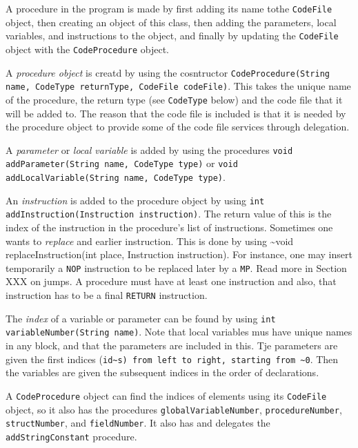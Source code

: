 \documentclass[11pt]{article}
\begin{document}
A procedure in the program is made by first adding its name tothe
\texttt{CodeFile} object, then creating an object of this class, then adding the
parameters, local variables, and instructions to the object, and finally by
updating the \texttt{CodeFile} object with the \texttt{CodeProcedure} object.

A \emph{procedure object} is creatd by using the cosntructor
\texttt{CodeProcedure(String name, CodeType returnType, CodeFile codeFile)}. This
takes the unique name of the procedure, the return type (see \texttt{CodeType}
below) and the code file that it will be added to. The reason that the code
file is included is that it is needed by the procedure object to provide
some of the code file services through delegation.


A \emph{parameter} or \emph{local variable} is added by using the procedures \texttt{void
addParameter(String name, CodeType type)} or \texttt{void addLocalVariable(String
name, CodeType type)}.


An \emph{instruction} is added to the procedure object by using \texttt{int
addInstruction(Instruction instruction)}. The return value of this is the
index of the instruction in the procedure's list of instructions. Sometimes
one wants to \emph{replace} and earlier instruction. This is done by using \textasciitilde{}void
replaceInstruction(int place, Instruction instruction). For instance, one
may insert temporarily a \texttt{NOP} instruction to be replaced later by a
\texttt{MP}. Read more in Section XXX on jumps. A procedure must have at least one
instruction and also, that instruction has to be a final \texttt{RETURN}
instruction.

The \emph{index} of a variable or parameter can be found by using \texttt{int
variableNumber(String name)}. Note that local variables mus have unique
names in any block, and that the parameters are included in this. Tje
parameters are given the first indices (\texttt{id\textasciitilde{}s) from left to right, starting
from \textasciitilde{}0}. Then the variables are given the subsequent indices in the order
of declarations.



A \texttt{CodeProcedure} object can find the indices of elements using its
\texttt{CodeFile} object, so it also has the procedures \texttt{globalVariableNumber},
\texttt{procedureNumber}, \texttt{structNumber}, and \texttt{fieldNumber}. It also has and
delegates the \texttt{addStringConstant} procedure.
\end{document}
